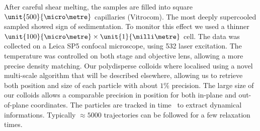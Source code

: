 \documentclass{revtex4-1}
\begin{document}
After careful shear melting, the samples are filled into square $\unit{500}{\micro\metre}$ capillaries (Vitrocom). The most deeply supercooled sampled showed sign of sedimentation. To monitor this effect we used a thinner $\unit{100}{\micro\metre}\times\unit{1}{\milli\metre}$ cell. The data was collected on a Leica SP5 confocal microscope, using \unit{532}{\nano\meter} laser excitation. The temperature was controlled on both stage and objective lens, allowing a more precise density matching. Our polydisperse colloids where localised using a novel multi-scale algorithm that will be described elsewhere, allowing us to retrieve both position and size of each particle with about $1\%$ precision. The large size of our colloids allows a comparable precision in position for both in-plane and out-of-plane coordinates. The particles are tracked in time~\citep{Crocker1996} to extract dynamical informations. Typically $\approx 5000$ trajectories can be followed for a few relaxation times.
\end{document}
